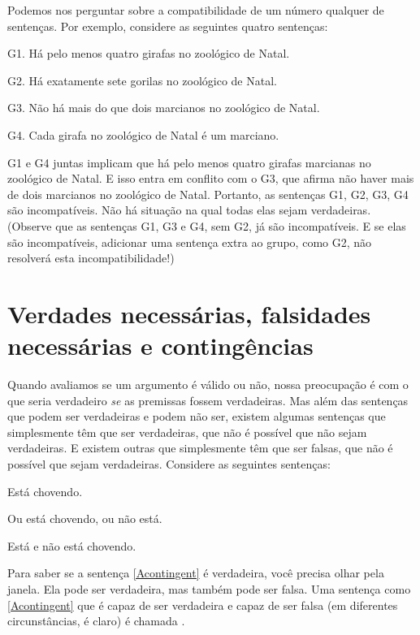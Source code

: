 Podemos nos perguntar sobre a compatibilidade de um número qualquer de sentenças.
Por exemplo, considere as seguintes quatro sentenças:
	\begin{ebullet}	
		\item[G1.] \label{MartianGiraffes} Há pelo menos quatro girafas no zoológico de Natal.
		\item[G2.] Há exatamente sete gorilas no zoológico de Natal.
		\item[G3.] Não há mais do que dois marcianos no zoológico de Natal.
		\item[G4.] Cada girafa no zoológico de Natal é um marciano.
	\end{ebullet}
G1 e G4 juntas implicam que há pelo menos quatro girafas marcianas no zoológico de Natal.
E isso entra em conflito com o G3, que afirma não haver mais de dois marcianos no zoológico de Natal.
Portanto, as sentenças G1, G2, G3, G4 são incompatíveis.
Não há situação na qual todas elas sejam verdadeiras. 
(Observe que as sentenças G1, G3 e G4, sem G2, já são incompatíveis.
E se elas são incompatíveis, adicionar uma sentença extra ao grupo, como G2, não resolverá esta incompatibilidade!)

\section[Verdades e falsidades necessárias e contingência]{Verdades necessárias, falsidades necessárias e contingências}

Quando avaliamos se um argumento é válido ou não, nossa preocupação é com o que seria verdadeiro \emph{se} as premissas fossem verdadeiras.
Mas além das sentenças que podem ser verdadeiras e podem não ser, existem algumas sentenças que simplesmente têm que ser verdadeiras, que não é possível que não sejam verdadeiras.
E existem outras que simplesmente têm que ser falsas, que não é possível que sejam verdadeiras.
Considere as seguintes sentenças:
	\begin{earg}
		\item[\ex{Acontingent}] Está chovendo.
		\item[\ex{Atautology}] Ou está chovendo, ou não está.
		\item[\ex{Acontradiction}] Está e não está chovendo.
	\end{earg}
Para saber se a sentença \ref{Acontingent} é verdadeira, você precisa olhar pela janela. Ela pode ser verdadeira, mas também pode ser falsa.
Uma sentença como \ref{Acontingent} que é capaz de ser verdadeira e capaz de ser falsa (em diferentes circunstâncias, é claro) é chamada .

